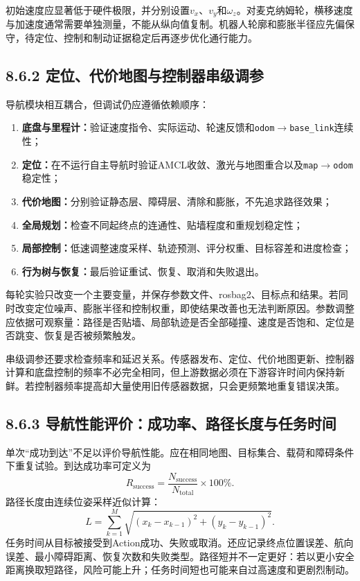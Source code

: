 \documentclass[UTF8,zihao=-4]{ctexart}
\begin{document}
初始速度应显著低于硬件极限，并分别设置$v_x$、$v_y$和$\omega_z$。对麦克纳姆轮，横移速度与加速度通常需要单独测量，不能从纵向值复制。机器人轮廓和膨胀半径应先偏保守，待定位、控制和制动证据稳定后再逐步优化通行能力。

\subsection*{8.6.2 定位、代价地图与控制器串级调参}

导航模块相互耦合，但调试仍应遵循依赖顺序：
\begin{enumerate}
  \item \textbf{底盘与里程计：}验证速度指令、实际运动、轮速反馈和\texttt{odom}$\rightarrow$\texttt{base\_link}连续性；
  \item \textbf{定位：}在不运行自主导航时验证AMCL收敛、激光与地图重合以及\texttt{map}$\rightarrow$\texttt{odom}稳定性；
  \item \textbf{代价地图：}分别验证静态层、障碍层、清除和膨胀，不先追求路径效果；
  \item \textbf{全局规划：}检查不同起终点的连通性、贴墙程度和重规划稳定性；
  \item \textbf{局部控制：}低速调整速度采样、轨迹预测、评分权重、目标容差和进度检查；
  \item \textbf{行为树与恢复：}最后验证重试、恢复、取消和失败退出。
\end{enumerate}

每轮实验只改变一个主要变量，并保存参数文件、rosbag2、目标点和结果。若同时改变定位噪声、膨胀半径和控制权重，即使结果改善也无法判断原因。参数调整应依据可观察量：路径是否贴墙、局部轨迹是否全部碰撞、速度是否饱和、定位是否跳变、恢复是否被频繁触发。

串级调参还要求检查频率和延迟关系。传感器发布、定位、代价地图更新、控制器计算和底盘控制的频率不必完全相同，但上游数据必须在下游容许时间内保持新鲜。若控制器频率提高却大量使用旧传感器数据，只会更频繁地重复错误决策。

\subsection*{8.6.3 导航性能评价：成功率、路径长度与任务时间}

单次“成功到达”不足以评价导航性能。应在相同地图、目标集合、载荷和障碍条件下重复试验。到达成功率可定义为
\begin{equation}
  R_{\mathrm{success}}=\frac{N_{\mathrm{success}}}{N_{\mathrm{total}}}\times100\%.
  \label{eq:navigation-success-rate}
\end{equation}
路径长度由连续位姿采样近似计算：
\begin{equation}
  L=\sum_{k=1}^{M}\sqrt{(x_k-x_{k-1})^2+(y_k-y_{k-1})^2}.
  \label{eq:executed-path-length}
\end{equation}
任务时间从目标被接受到Action成功、失败或取消。还应记录终点位置误差、航向误差、最小障碍距离、恢复次数和失败类型。路径短并不一定更好：若以更小安全距离换取短路径，风险可能上升；任务时间短也可能来自过高速度和更剧烈制动。
\end{document}
